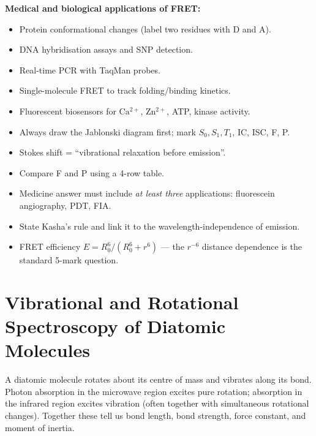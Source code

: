 \documentclass[12pt,a4paper]{article}
\begin{document}
\textbf{Medical and biological applications of FRET:}
\begin{itemize}[leftmargin=*, itemsep=1pt, topsep=2pt]
  \item Protein conformational changes (label two residues with D and A).
  \item DNA hybridisation assays and SNP detection.
  \item Real-time PCR with TaqMan probes.
  \item Single-molecule FRET to track folding/binding kinetics.
  \item Fluorescent biosensors for $\mathrm{Ca^{2+}}$, $\mathrm{Zn^{2+}}$, ATP, kinase activity.
\end{itemize}

\begin{tcolorbox}[exambox, title={Exam Points (Section 3)}]
\begin{itemize}[leftmargin=*, itemsep=2pt, topsep=2pt]
  \item Always draw the Jablonski diagram first; mark $S_0, S_1, T_1$, IC, ISC, F, P.
  \item Stokes shift = ``vibrational relaxation before emission''.
  \item Compare F and P using a 4-row table.
  \item Medicine answer must include \emph{at least three} applications: fluorescein angiography, PDT, FIA.
  \item State Kasha's rule and link it to the wavelength-independence of emission.
  \item FRET efficiency $E = R_0^6/(R_0^6+r^6)$ — the $r^{-6}$ distance dependence is the standard 5-mark question.
\end{itemize}
\end{tcolorbox}

\section{Vibrational and Rotational Spectroscopy of Diatomic Molecules}

\begin{tcolorbox}[defbox]
A diatomic molecule rotates about its centre of mass and vibrates along its bond. Photon absorption in the microwave region excites pure rotation; absorption in the infrared region excites vibration (often together with simultaneous rotational changes). Together these tell us bond length, bond strength, force constant, and moment of inertia.
\end{tcolorbox}
\end{document}
